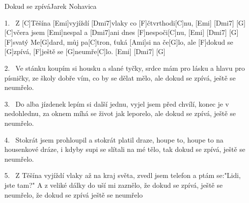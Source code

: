 \begin{song}{Dokud se zpívá}{Jarek Nohavica}

\begin{xverse}{1.~}
Z [C]Těšína [Emi]vyjíždí [Dmi7]vlaky co [F]{}čtvrthodi[C]nu, [Emi]{\qquad} [Dmi7]{\qquad} [G]{\qquad}
[C]včera jsem [Emi]nespal a [Dmi7]ani dnes [F]nespoči[C]nu,  [Emi]{\qquad} [Dmi7]{\qquad} [G]{\qquad}
[F]svatý Me[G]dard, můj pa[C]tron, ťuká [Ami]si na če[G]lo,
ale [F]dokud se [G]zpívá, [F]ještě se [G]neumře[C]lo.  [Emi]{\qquad} [Dmi7]{\qquad} [G]{\qquad}
\end{xverse}

\begin{xverse}{2.~}
Ve stánku koupím si housku a slané tyčky,
srdce mám pro lásku a hlavu pro písničky,
ze školy dobře vím, co by se dělat mělo,
ale dokud se zpívá, ještě se neumřelo.
\end{xverse}

\begin{xverse}{3.~}
Do alba jízdenek lepím si další jednu,
vyjel jsem před chvílí, konec je v nedohlednu,
za oknem míhá se život jak leporelo,
ale dokud se zpívá, ještě se neumřelo.
\end{xverse}

\begin{xverse}{4.~}
Stokrát jsem prohloupil a stokrát platil draze,
houpe to, houpe to na housenkové dráze,
i kdyby supi se slítali na mé tělo,
tak dokud se zpívá, ještě se neumřelo.
\end{xverse}

\begin{xverse}{5.~}
Z Těšína vyjíždí vlaky až na kraj světa,
zvedl jsem telefon a ptám se:"Lidi, jste tam?"
A z veliké dálky do uší mi zaznělo,
že dokud se zpívá, ještě se neumřelo,
že dokud se zpívá ještě se neumřelo
\end{xverse}

\end{song}
\chords{\chordDmiSeven}

